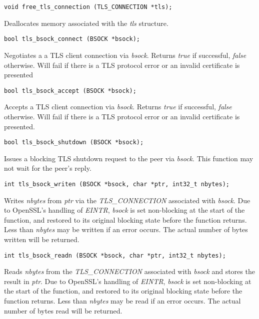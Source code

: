 \footnotesize
\begin{verbatim}
void free_tls_connection (TLS_CONNECTION *tls);
\end{verbatim}
\normalsize

Deallocates memory associated with the \emph{tls} structure.

\footnotesize
\begin{verbatim}
bool tls_bsock_connect (BSOCK *bsock);
\end{verbatim}
\normalsize

Negotiates a a TLS client connection via \emph{bsock}.  Returns \emph{true}
if successful, \emph{false} otherwise.  Will fail if there is a TLS
protocol error or an invalid certificate is presented

\footnotesize
\begin{verbatim}
bool tls_bsock_accept (BSOCK *bsock);
\end{verbatim}
\normalsize

Accepts a TLS client connection via \emph{bsock}.  Returns \emph{true} if
successful, \emph{false} otherwise.  Will fail if there is a TLS protocol
error or an invalid certificate is presented.

\footnotesize
\begin{verbatim}
bool tls_bsock_shutdown (BSOCK *bsock);
\end{verbatim}
\normalsize

Issues a blocking TLS shutdown request to the peer via \emph{bsock}. This function may not wait for the peer's reply.

\footnotesize
\begin{verbatim}
int tls_bsock_writen (BSOCK *bsock, char *ptr, int32_t nbytes);
\end{verbatim}
\normalsize

Writes \emph{nbytes} from \emph{ptr} via the \emph{TLS\_CONNECTION}
associated with \emph{bsock}.  Due to OpenSSL's handling of \emph{EINTR},
\emph{bsock} is set non-blocking at the start of the function, and restored
to its original blocking state before the function returns.  Less than
\emph{nbytes} may be written if an error occurs.  The actual number of
bytes written will be returned.

\footnotesize
\begin{verbatim}
int tls_bsock_readn (BSOCK *bsock, char *ptr, int32_t nbytes);
\end{verbatim}
\normalsize

Reads \emph{nbytes} from the \emph{TLS\_CONNECTION} associated with
\emph{bsock} and stores the result in \emph{ptr}.  Due to OpenSSL's
handling of \emph{EINTR}, \emph{bsock} is set non-blocking at the start of
the function, and restored to its original blocking state before the
function returns.  Less than \emph{nbytes} may be read if an error occurs.
The actual number of bytes read will be returned.

